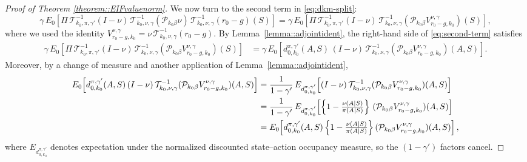\documentclass[11pt]{article}
\theoremstyle{plain}
\begin{document}
\begin{proof}[Proof of Theorem \ref{theorem::EIFvaluenorm}]
We now turn to the second term in \eqref{eq:dkm-split}:
\begin{equation}
\label{eq:second-term}
\gamma\,E_0\!\left[\Pi\,\mathcal{T}_{k_0,\pi,\gamma'}^{-1}(I-\nu)\,
      \mathcal{T}_{k_0,\nu,\gamma}^{-1}(\mathcal{P}_{k_0\beta} \nu)\,
      \mathcal{T}_{k_0,\nu,\gamma}^{-1}(r_0-g)(S)\right]
= \gamma\,E_0\!\left[\Pi\,\mathcal{T}_{k_0,\pi,\gamma'}^{-1}(I-\nu)\,
      \mathcal{T}_{k_0,\nu,\gamma}^{-1}(\mathcal{P}_{k_0\beta} V_{r_0-g,k_0}^{\nu,\gamma})(S)\right],
\end{equation}
where we used the identity \(V_{r_0-g,k_0}^{\nu,\gamma} = \nu\,\mathcal{T}_{k_0,\nu,\gamma}^{-1}(r_0-g)\).  
By Lemma~\ref{lemma::adjointident}, the right-hand side of \eqref{eq:second-term} satisfies
\begin{align*}
   \gamma\,E_0\!\left[\Pi\,\mathcal{T}_{k_0,\pi,\gamma'}^{-1}(I-\nu)\,
      \mathcal{T}_{k_0,\nu,\gamma}^{-1}(\mathcal{P}_{k_0\beta} V_{r_0-g,k_0}^{\nu,\gamma})(S)\right] 
    &=  \gamma\,E_0\!\left[d_{0,k_0}^{\pi,\gamma'}(A,S)\,(I - \nu)\,
      \mathcal{T}_{k_0,\nu,\gamma}^{-1}(\mathcal{P}_{k_0\beta} V_{r_0-g,k_0}^{\nu,\gamma})(A,S)\right].
\end{align*}
Moreover, by a change of measure and another application of Lemma~\ref{lemma::adjointident},
\begin{align}
E_0\!\left[d_{0,k_0}^{\pi,\gamma'}(A,S)\,(I - \nu)\,\mathcal{T}_{k_0,\nu,\gamma}^{-1}(\mathcal{P}_{k_0\beta} V_{r_0-g,k_0}^{\nu,\gamma})(A,S)\right]
&= \frac{1}{1-\gamma'}\,E_{d_{0,k_0}^{\pi,\gamma'}}\!\left[(I - \nu)\,\mathcal{T}_{k_0,\nu,\gamma}^{-1}(\mathcal{P}_{k_0\beta} V_{r_0-g,k_0}^{\nu,\gamma})(A,S)\right] \notag \\
&= \frac{1}{1-\gamma'}\,E_{d_{0,k_0}^{\pi,\gamma'}}\!\left[\left\{1 - \tfrac{\nu(A \mid S)}{\pi(A \mid S)}\right\}\,(\mathcal{P}_{k_0\beta} V_{r_0-g,k_0}^{\nu,\gamma})(A,S)\right] \notag \\
&= E_0\!\left[d_{0,k_0}^{\pi,\gamma'}(A,S)\left\{1 - \tfrac{\nu(A \mid S)}{\pi(A \mid S)}\right\}(\mathcal{P}_{k_0\beta} V_{r_0-g,k_0}^{\nu,\gamma})(A,S)\right],
\label{eq:change-measure}
\end{align}
where \(E_{d_{0,k_0}^{\pi,\gamma'}}\) denotes expectation under the normalized discounted state–action occupancy measure, so the \((1-\gamma')\) factors cancel.


\end{proof}
\end{document}
